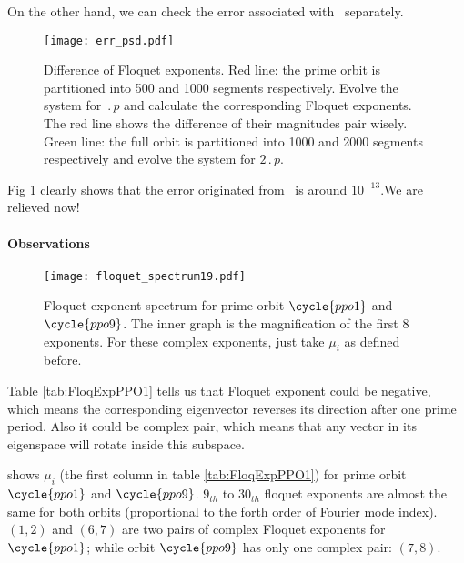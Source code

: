 		On the other hand, we can check the error associated with \psd\ separately.
		\begin{figure}[h]
			\centering
			\texttt{[image: err\_psd.pdf]}
			\caption{Difference of Floquet exponents. Red line: the prime orbit is partitioned into 500 and
			1000 segments respectively. Evolve the system for $\period{p}$
			and calculate the corresponding Floquet exponents. The red line shows the difference of
			their magnitudes pair wisely. Green line: the full orbit is partitioned into 1000 and 2000
			segments respectively and evolve the system for $2\period{p}$.}
			\label{fig:err_psd}
		\end{figure}
		Fig \ref{fig:err_psd} clearly shows that the error originated from \psd\ is around $10^{-13}$.We
		are relieved now!

		\paragraph{Observations}

		\begin{figure}[h]
			\centering
			\texttt{[image: floquet\_spectrum19.pdf]}
			\caption{ Floquet exponent spectrum for prime orbit $\cycle{ppo1}$ and $\cycle{ppo9}$.
			The inner graph is the magnification of the first 8 exponents. For these complex exponents,
			just take $\mu_{i}$ as defined before.
			}
			\label{fig:floquet_spectrum19}
		\end{figure}
		
			Table \ref{tab:FloqExpPPO1} tells us that Floquet exponent could be negative, which
			means the corresponding eigenvector reverses its direction after one prime period. Also it
			could be complex pair, which means that any vector in its eigenspace  will rotate inside this
			subspace.

			 shows $\mu_{i}$ (the first column in table
			\ref{tab:FloqExpPPO1}) for prime orbit $\cycle{ppo1}$ and $\cycle{ppo9}$. $9_{th}$ to
			$30_{th}$ floquet exponents are almost the same for both orbits (proportional to the
			forth order of Fourier mode index). $(1,2)$ and $(6,7)$ are two pairs of complex
			Floquet exponents for $\cycle{ppo1}$; while orbit $\cycle{ppo9}$ has only one complex pair: $(7,8)$.





	\subsubsection{\cLvs}
	
